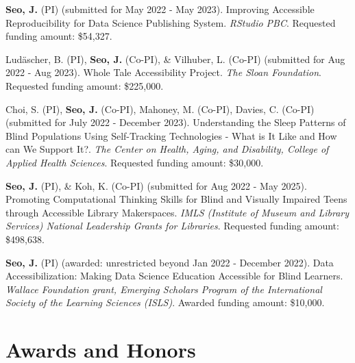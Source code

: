 \documentclass[11pt,a4paper,]{awesome-cv}
\begin{document}
\textbf{Seo, J.} (PI) (submitted for May 2022 - May 2023). Improving
Accessible Reproducibility for Data Science Publishing System.
\emph{RStudio PBC}. Requested funding amount: \$54,327.

Ludäscher, B. (PI), \textbf{Seo, J.} (Co-PI), \& Vilhuber, L. (Co-PI)
(submitted for Aug 2022 - Aug 2023). Whole Tale Accessibility Project.
\emph{The Sloan Foundation}. Requested funding amount: \$225,000.

Choi, S. (PI), \textbf{Seo, J.} (Co-PI), Mahoney, M. (Co-PI), Davies, C.
(Co-PI) (submitted for July 2022 - December 2023). Understanding the
Sleep Patterns of Blind Populations Using Self-Tracking Technologies -
What is It Like and How can We Support It?. \emph{The Center on Health,
Aging, and Disability, College of Applied Health Sciences}. Requested
funding amount: \$30,000.

\textbf{Seo, J.} (PI), \& Koh, K. (Co-PI) (submitted for Aug 2022 - May
2025). Promoting Computational Thinking Skills for Blind and Visually
Impaired Teens through Accessible Library Makerspaces. \emph{IMLS
(Institute of Museum and Library Services) National Leadership Grants
for Libraries}. Requested funding amount: \$498,638.

\textbf{Seo, J.} (PI) (awarded: unrestricted beyond Jan 2022 - December
2022). Data Accessibilization: Making Data Science Education Accessible
for Blind Learners. \emph{Wallace Foundation grant, Emerging Scholars
Program of the International Society of the Learning Sciences (ISLS)}.
Awarded funding amount: \$10,000.

\hypertarget{awards-and-honors}{%
\section{Awards and Honors}\label{awards-and-honors}}
\end{document}
